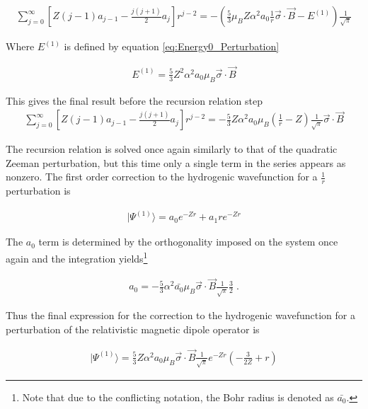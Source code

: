             \begin{align}
                \sum_{j = 0}^\infty \left[ Z(j-1)a_{j-1} - \frac{j(j+1)}{2} a_j \right] r^{j -2} = -\left(\frac{5}{3}\mu_B Z \alpha^2 a_0 \frac{1}{r} \vec{\sigma} \cdot \vec{B} - E^{(1)} \right) \frac{1}{\sqrt{\pi}}
            \end{align}

            \noindent Where $E^{(1)}$ is defined by equation \eqref{eq:Energy0_Perturbation}

            \begin{align}
                E^{(1)} = \frac{5}{3} Z^2 \alpha^2 a_0 \mu_B \vec{\sigma} \cdot \vec{B}
            \end{align}

            \noindent This gives the final result before the recursion relation step
            \begin{align}
                \sum_{j = 0}^\infty \left[ Z(j-1)a_{j-1} - \frac{j(j+1)}{2} a_j \right] r^{j -2} = -\frac{5}{3} Z \alpha^2 a_0 \mu_B \left(\frac{1}{r} - Z \right) \frac{1}{\sqrt{\pi}}\vec{\sigma} \cdot \vec{B}
            \end{align}

            \noindent The recursion relation is solved once again similarly to that of the quadratic Zeeman perturbation, but this time only a single term in the series appears as nonzero. The first order correction to the hydrogenic wavefunction for a $\frac{1}{r}$ perturbation is 

            \begin{align}
                \vert \varPsi^{(1)} \rangle = a_0 e^{-Zr} + a_1 re^{-Zr}
            \end{align}

            \noindent The $a_0$ term is determined by the orthogonality imposed on the system once again and the integration yields\footnote{Note that due to the conflicting notation, the Bohr radius is denoted as $\bar{a_0}$.}
            
            \begin{align}
                a_0 = -\frac{5}{3} \alpha^2 \bar{a_0} \mu_B \vec{\sigma} \cdot \vec{B} \frac{1}{\sqrt{\pi}} \frac{3}{2}\;.
            \end{align}

            Thus the final expression for the correction to the hydrogenic wavefunction for a perturbation of the relativistic magnetic dipole operator is 

            \begin{align}
                \vert \varPsi^{(1)} \rangle = \frac{5}{3} Z \alpha^2 a_0 \mu_B \vec{\sigma} \cdot \vec{B} \frac{1}{\sqrt{\pi}} e^{-Zr} \left( - \frac{3}{2Z} + r \right)
            \end{align}

